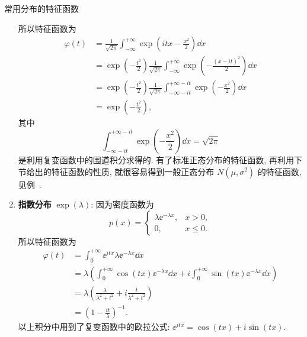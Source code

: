 \begin{example}{常用分布的特征函数}
\begin{enumerate}
        所以特征函数为
        \begin{align*}
            \varphi (t) & = \frac{1}{\sqrt{2\pi}} \int_{-\infty}^{+\infty} \exp \left( itx - \frac{x^2}{2} \right) \dd x\\
            & = \exp \left( -\frac{t^2}{2} \right) \frac{1}{\sqrt{2\pi}} \int_{-\infty}^{+\infty} \exp \left( -\frac{( x - it )^2}{2} \right) \dd x\\
            & = \exp \left( -\frac{t^2}{2} \right) \frac{1}{\sqrt{2\pi}} \int_{-\infty -it}^{+\infty -it} \exp \left( -\frac{x^2}{2} \right) \dd x\\
            & = \exp \left( -\frac{t^2}{2} \right),
        \end{align*}
        其中
        \begin{equation*}
            \int_{-\infty -it}^{+\infty -it} \exp \left( -\frac{x^2}{2} \right) \dd x = \sqrt{2\pi}
        \end{equation*}
        是利用复变函数中的围道积分求得的.
        有了标准正态分布的特征函数,
        再利用下节给出的特征函数的性质,
        就很容易得到一般正态分布 $ N ( \mu, \sigma^2 ) $ 的特征函数,
        见例~.
        \item \textbf{指数分布} $ \exp ( \lambda ) $: 因为密度函数为
        \begin{equation*}
            p (x) =
            \begin{cases}
                \lambda \ee^{-\lambda x}, & x > 0,\\
                0, & x \leq 0.
            \end{cases}
        \end{equation*}
        所以特征函数为
        \begin{align*}
            \varphi (t) & = \int_0^{+\infty} \ee^{itx} \lambda \ee^{-\lambda x} \dd x\\
            & = \lambda \left( \int_0^{+\infty} \cos (tx) \ee^{-\lambda x} \dd x + i \int_0^{+\infty} \sin (tx) \ee^{-\lambda x} \dd x \right)\\
            & = \lambda \left( \frac{\lambda}{\lambda^2 + t^2} + i \frac{t}{\lambda^2 + t^2} \right)\\
            & = \left( 1 - \frac{it}{\lambda} \right)^{-1}.
        \end{align*}
        以上积分中用到了复变函数中的欧拉公式: $ \ee^{itx} = \cos (tx) + i \sin ( tx) $.
    \end{enumerate}
\end{example}

